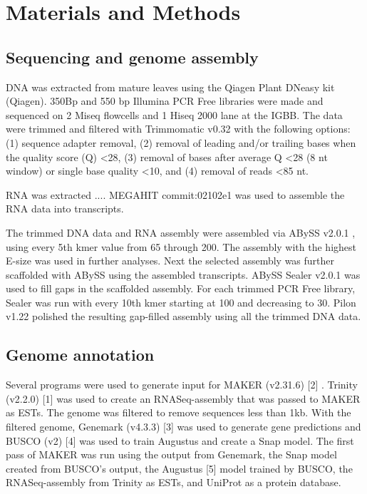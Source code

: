 \documentclass[10pt,letterpaper]{article}
\begin{document}
\section*{Materials and Methods}
\subsection*{Sequencing and genome assembly}

DNA was extracted from mature leaves using the Qiagen Plant DNeasy kit (Qiagen).
350Bp and 550 bp Illumina PCR Free libraries were made and sequenced on 2 Miseq
flowcells and 1 Hiseq 2000 lane at the IGBB. The data were trimmed and filtered
with Trimmomatic v0.32 \cite{Bolger2014} with the following options: (1)
sequence adapter removal, (2) removal of leading and/or trailing bases when the
quality score (Q) <28, (3) removal of bases after average Q <28 (8 nt window) or
single base quality <10, and (4) removal of reads <85 nt.

RNA was extracted .... MEGAHIT commit:02102e1 \cite{Li2015} was used to assemble
the RNA data into transcripts.

The trimmed DNA data and RNA assembly were assembled via ABySS v2.0.1
\cite{Simpson2009}, using every 5th kmer value from 65 through 200. The assembly
with the highest E-size \cite{Salzberg2012} was used in further analyses. Next
the selected assembly was further scaffolded with ABySS using the assembled
transcripts. ABySS Sealer v2.0.1 \cite{Paulino2015} was used to fill gaps in the
scaffolded assembly. For each trimmed PCR Free library, Sealer was run with
every 10th kmer starting at 100 and decreasing to 30. Pilon v1.22
\cite{Walker2014} polished the resulting gap-filled assembly using all the
trimmed DNA data.


\subsection*{Genome annotation}

Several programs were used to generate input for MAKER (v2.31.6) [2] . Trinity
(v2.2.0) [1] was used to create an RNASeq-assembly that was passed to MAKER as
ESTs. The genome was filtered to remove sequences less than 1kb. With the
filtered genome, Genemark (v4.3.3) [3] was used to generate gene predictions and
BUSCO (v2) [4] was used to train Augustus and create a Snap model. The first
pass of MAKER was run using the output from Genemark, the Snap model created
from BUSCO's output, the Augustus [5] model trained by BUSCO, the
RNASeq-assembly from Trinity as ESTs, and UniProt as a protein database.
\end{document}
